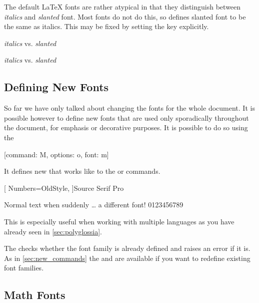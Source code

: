 The default \LaTeX{} fonts are rather atypical in that they distinguish between
\textit{italics} and \textsl{slanted} font. Most fonts do not do this, so
 defines slanted font to be the same as italics. This may be
fixed by setting the  key explicitly.
\begin{example}[vertical_mode, examplewidth=0.7\linewidth]
\setmainfont{Latin Modern Roman}
\textit{italics} vs. \textsl{slanted}

\setmainfont[
  SlantedFont=Latin Modern Roman Slanted,
]{Latin Modern Roman}
\textit{italics} vs. \textsl{slanted}
\end{example}

\subsection{Defining New Fonts}

So far we have only talked about changing the fonts for the whole document. It
is possible however to define new fonts that are used only sporadically
throughout the document, for emphasis or decorative purposes. It is possible to
do so using the
\begin{lscommand}
  [command: M, options: o, font: m]
\end{lscommand}
It defines new  that works like to the  or
 commands.
\begin{example}
\newfontfamily{\sourcefamily}[
  Numbers=OldStyle,
]{Source Serif Pro}

Normal text when suddenly
\ldots{} \sourcefamily
a different font! 0123456789
\end{example}
This is especially useful when working with multiple languages as you have
already seen in \autoref{sec:polyglossia}.

The  checks whether the font family is already defined and
raises an error if it is. As in \autoref{sec:new_commands} the
 and  are available if you want to
redefine existing font families.

\subsection{Math Fonts}\label{sec:math_fonts}

